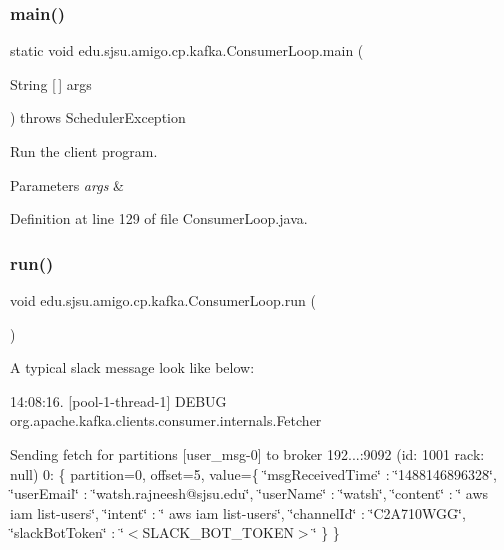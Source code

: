 \subsubsection{\texorpdfstring{main()}{main()}}
{\footnotesize\ttfamily static void edu.\+sjsu.\+amigo.\+cp.\+kafka.\+Consumer\+Loop.\+main (\begin{DoxyParamCaption}\item[{String \mbox{[}$\,$\mbox{]}}]{args }\end{DoxyParamCaption}) throws Scheduler\+Exception\hspace{0.3cm}{\ttfamily [static]}}

Run the client program.


\begin{DoxyParams}{Parameters}
{\em args} & \\
\hline
\end{DoxyParams}


Definition at line 129 of file Consumer\+Loop.\+java.

\mbox{\label{classedu_1_1sjsu_1_1amigo_1_1cp_1_1kafka_1_1_consumer_loop_adca27141d9a3f2ad526f060764321b15}} 
\subsubsection{\texorpdfstring{run()}{run()}}
{\footnotesize\ttfamily void edu.\+sjsu.\+amigo.\+cp.\+kafka.\+Consumer\+Loop.\+run (\begin{DoxyParamCaption}{ }\end{DoxyParamCaption})}

A typical slack message look like below\+:

14\+:08\+:16. \mbox{[}pool-\/1-\/thread-\/1\mbox{]} D\+E\+B\+UG org.\+apache.\+kafka.\+clients.\+consumer.\+internals.\+Fetcher
\begin{DoxyItemize}
\item Sending fetch for partitions \mbox{[}user\+\_\+msg-\/0\mbox{]} to broker 192...\+:9092 (id\+: 1001 rack\+: null) 0\+: \{ partition=0, offset=5, value=\{ \char`\"{}msg\+Received\+Time\char`\"{} \+: \char`\"{}1488146896328\char`\"{}, \char`\"{}user\+Email\char`\"{} \+: \char`\"{}watsh.\+rajneesh@sjsu.\+edu\char`\"{}, \char`\"{}user\+Name\char`\"{} \+: \char`\"{}watsh\char`\"{}, \char`\"{}content\char`\"{} \+: \char`\"{} aws iam list-\/users\char`\"{}, \char`\"{}intent\char`\"{} \+: \char`\"{} aws iam list-\/users\char`\"{}, \char`\"{}channel\+Id\char`\"{} \+: \char`\"{}\+C2\+A710\+W\+G\+G\char`\"{}, \char`\"{}slack\+Bot\+Token\char`\"{} \+: \char`\"{}$<$\+S\+L\+A\+C\+K\+\_\+\+B\+O\+T\+\_\+\+T\+O\+K\+E\+N$>$\char`\"{} \} \}
\end{DoxyItemize}

